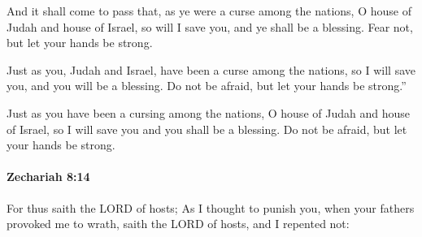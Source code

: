 			\begin{versebox}
					\item[BHS] 
					\item[LXX] 
					\item[ASV] And it shall come to pass that, as ye were a curse among the nations, O house of Judah and house of Israel, so will I save you, and ye shall be a blessing. Fear not, but let your hands be strong.
					\item[NIV] Just as you, Judah and Israel, have been a curse among the nations, so I will save you, and you will be a blessing. Do not be afraid, but let your hands be strong.”
					\item[NRSV] Just as you have been a cursing among the nations, O house of Judah and house of Israel, so I will save you and you shall be a blessing. Do not be afraid, but let your hands be strong.
			\end{versebox}

		\paragraph{Zechariah 8:14} %
			\label{ZECHARIAH-8-14}

			For thus saith the LORD of hosts; As I thought to punish you, when your fathers provoked me to wrath, saith the LORD of hosts, and I repented not:

